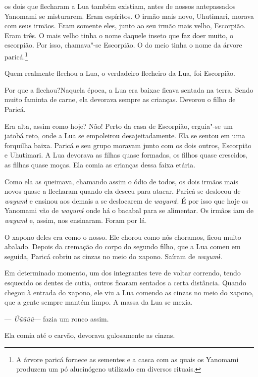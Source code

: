  

 os dois que flecharam a Lua também existiam, antes de nossos
antepassados Yanomami se misturarem. Eram espíritos. O irmão mais novo,
Uhutimari, morava com seus irmãos. Eram somente eles, junto ao seu irmão
mais velho, Escorpião. Eram três. O mais velho tinha o nome daquele
inseto que faz doer muito, o escorpião. Por isso, chamava"-se Escorpião.
O do meio tinha o nome da árvore paricá.\footnote{ A árvore paricá fornece as sementes e a casca com as quais os Yanomami
produzem um pó alucinógeno utilizado em diversos rituais.} 

Quem realmente flechou a Lua, o verdadeiro flecheiro da Lua, foi
Escorpião. 

Por que a flechou?Naquela época, a Lua era baixae ficava sentada na
terra. Sendo muito faminta de carne, ela devorava sempre as crianças.
Devorou o filho de Paricá. 

Era alta, assim como hoje? Não! Perto da casa de Escorpião, erguia"-se um
jatobá reto, onde a Lua se empoleirou desajeitadamente. Ela se sentou em
uma forquilha baixa. Paricá e seu grupo moravam junto com os dois
outros, Escorpião e Uhutimari. A Lua devorava as filhas quase formadas,
os filhos quase crescidos, as filhas quase moças. Ela comia as crianças
dessa faixa etária. 

Como ela as queimava, chamando assim o ódio de todos, os dois irmãos
mais novos quase a flecharam quando ela desceu para
atacar{.} Paricá se deslocou de \emph{wayumɨ} e ensinou aos
demais a se deslocarem de \emph{wayumɨ.} É por isso que hoje os Yanomami
vão de \emph{wayumɨ} onde há o bacabal para se alimentar. Os irmãos iam
de \emph{wayumɨ} e, assim, nos ensinaram. Foram por lá.

O xapono deles era como o nosso. Ele chorou como nós choramos, ficou
muito abalado. Depois da cremação do corpo do segundo filho, que a Lua
comeu em seguida, Paricá cobriu as cinzas no meio do xapono. Saíram
de \emph{wayumɨ}. 

Em determinado momento, um dos integrantes teve de voltar correndo,
tendo esquecido os dentes de cutia, outros ficaram sentados a certa
distância. Quando chegou à entrada do xapono, ele viu a Lua comendo as
cinzas no meio do xapono, que a gente sempre mantém limpo. A massa da
Lua se mexia.

--- \emph{Ũũũũũ}--- fazia um ronco assim. 

Ela comia até o carvão, devorava gulosamente as cinzas. 

